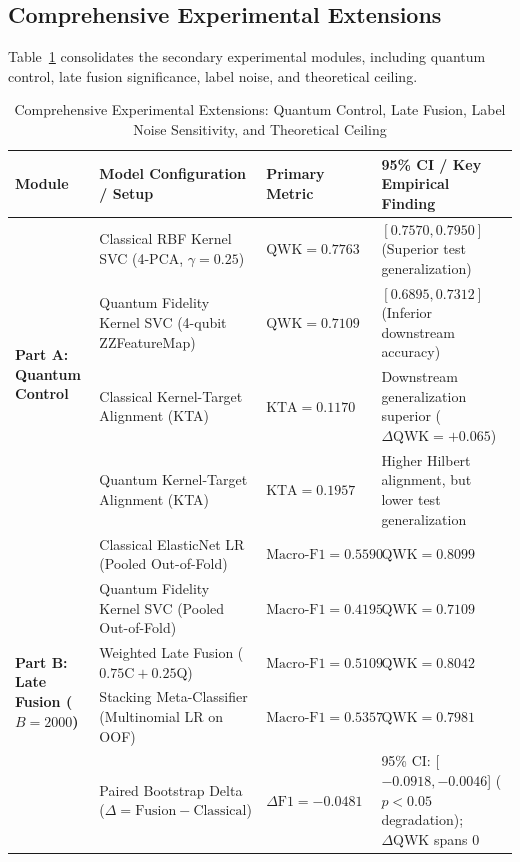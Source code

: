 \documentclass[conference]{IEEEtran}
\begin{document}
\subsection{Comprehensive Experimental Extensions}
Table~\ref{tab:extensions_benchmark} consolidates the secondary experimental modules, including quantum control, late fusion significance, label noise, and theoretical ceiling.

\begin{table}[t]
\centering
\caption{Comprehensive Experimental Extensions: Quantum Control, Late Fusion, Label Noise Sensitivity, and Theoretical Ceiling}
\label{tab:extensions_benchmark}
\renewcommand{\arraystretch}{0.95}
\footnotesize
\begin{tabularx}{\textwidth}{p{3.2cm}p{4.5cm}p{2.2cm}X}
\toprule
\textbf{Module} & \textbf{Model Configuration / Setup} & \textbf{Primary Metric} & \textbf{95\% CI / Key Empirical Finding} \\
\midrule
\multirow{4}{*}{\textbf{Part A: Quantum Control}} 
& Classical RBF Kernel SVC (4-PCA, $\gamma = 0.25$) & $\text{QWK} = \mathbf{0.7763}$ & $[0.7570, 0.7950]$ (Superior test generalization) \\
& Quantum Fidelity Kernel SVC (4-qubit ZZFeatureMap) & $\text{QWK} = 0.7109$ & $[0.6895, 0.7312]$ (Inferior downstream accuracy) \\
& Classical Kernel-Target Alignment (KTA) & $\text{KTA} = 0.1170$ & Downstream generalization superior ($\Delta\text{QWK} = +0.065$) \\
& Quantum Kernel-Target Alignment (KTA) & $\text{KTA} = \mathbf{0.1957}$ & Higher Hilbert alignment, but lower test generalization \\
\midrule
\multirow{5}{*}{\textbf{Part B: Late Fusion ($B = 2000$)}} 
& Classical ElasticNet LR (Pooled Out-of-Fold) & $\text{Macro-F1} = \mathbf{0.5590}$ & $\text{QWK} = \mathbf{0.8099}$ \\
& Quantum Fidelity Kernel SVC (Pooled Out-of-Fold) & $\text{Macro-F1} = 0.4195$ & $\text{QWK} = 0.7109$ \\
& Weighted Late Fusion ($0.75\text{C} + 0.25\text{Q}$) & $\text{Macro-F1} = 0.5109$ & $\text{QWK} = 0.8042$ \\
& Stacking Meta-Classifier (Multinomial LR on OOF) & $\text{Macro-F1} = 0.5357$ & $\text{QWK} = 0.7981$ \\
& Paired Bootstrap Delta ($\Delta = \text{Fusion} - \text{Classical}$) & $\Delta\text{F1} = -0.0481$ & 95\% CI: [$-0.0918, -0.0046$] ($p < 0.05$ degradation); $\Delta\text{QWK}$ spans 0 \\

\end{tabularx}
\end{table}
\end{document}
